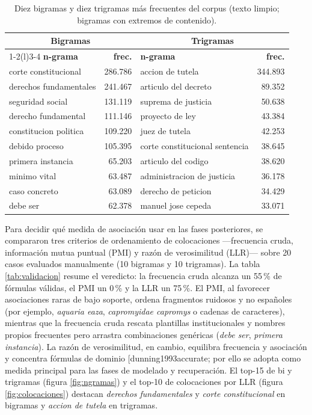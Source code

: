 \documentclass[11pt]{tg_usta}
\makeatletter
\renewcommand{\cite}{\@ifnextchar[{\@tempswatrue\@citex}{\@tempswafalse\@citex[]}}
\makeatother
\begin{document}
\begin{table}[htbp]
    \centering
    \caption{Diez bigramas y diez trigramas más frecuentes del corpus (texto limpio; bigramas con extremos de contenido).}
    \label{tab:ngramas}
    \begin{tabular}{lr@{\hskip 0.6cm}lr}
        \toprule
        \multicolumn{2}{c}{\textbf{Bigramas}} & \multicolumn{2}{c}{\textbf{Trigramas}} \\
        \cmidrule(r){1-2}\cmidrule(l){3-4}
        \textbf{n-grama} & \textbf{frec.} & \textbf{n-grama} & \textbf{frec.} \\
        \midrule
        corte constitucional & 286.786 & accion de tutela & 344.893 \\
        derechos fundamentales & 241.467 & articulo del decreto & 89.352 \\
        seguridad social & 131.119 & suprema de justicia & 50.638 \\
        derecho fundamental & 111.146 & proyecto de ley & 43.384 \\
        constitucion politica & 109.220 & juez de tutela & 42.253 \\
        debido proceso & 105.395 & corte constitucional sentencia & 38.645 \\
        primera instancia & 65.203 & articulo del codigo & 38.620 \\
        minimo vital & 63.487 & administracion de justicia & 36.178 \\
        caso concreto & 63.089 & derecho de peticion & 34.429 \\
        debe ser & 62.378 & manuel jose cepeda & 33.071 \\
        \bottomrule
    \end{tabular}
\end{table}

Para decidir qué medida de asociación usar en las fases posteriores, se compararon tres criterios de ordenamiento de colocaciones ---frecuencia cruda, información mutua puntual (PMI) y razón de verosimilitud (LLR)--- sobre 20 casos evaluados manualmente (10 bigramas y 10 trigramas). La tabla \ref{tab:validacion} resume el veredicto: la frecuencia cruda alcanza un 55\,\% de fórmulas válidas, el PMI un 0\,\% y la LLR un 75\,\%. El PMI, al favorecer asociaciones raras de bajo soporte, ordena fragmentos ruidosos y no españoles (por ejemplo, \emph{aquaria eaza}, \emph{capromyidae capromys} o cadenas de caracteres), mientras que la frecuencia cruda rescata plantillas institucionales y nombres propios frecuentes pero arrastra combinaciones genéricas (\emph{debe ser}, \emph{primera instancia}). La razón de verosimilitud, en cambio, equilibra frecuencia y asociación y concentra fórmulas de dominio \cite{dunning1993accurate}; por ello se adopta como medida principal para las fases de modelado y recuperación. El top-15 de bi y trigramas (figura \ref{fig:ngramas}) y el top-10 de colocaciones por LLR (figura \ref{fig:colocaciones}) destacan \emph{derechos fundamentales} y \emph{corte constitucional} en bigramas y \emph{accion de tutela} en trigramas.
\end{document}
